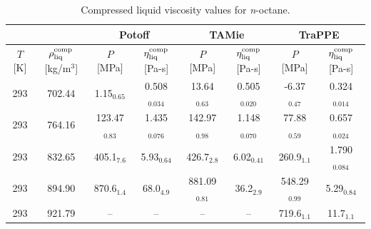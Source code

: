 \documentclass[preprint,review,12pt]{elsarticle}
\begin{document}
	\begin{table}[H]
		\caption{Compressed liquid viscosity values for \textit{n}-octane.}
		\begin{center}
			\begin{tabular}{|c|c|c|c|c|c|c|c|}
				\hline
				&                  & \multicolumn{2}{c|}{Potoff}     & \multicolumn{2}{c|}{TAMie}      & \multicolumn{2}{c|}{TraPPE}    \\ \hline
				$T$ {[}K{]} & $\rho^{\rm comp}_{\rm liq}$ {[}kg/m$^3${]} & $P$ {[}MPa{]}    & $\eta^{\rm comp}_{\rm liq}$ {[}Pa-s{]} & $P$ {[}MPa{]}    & $\eta^{\rm comp}_{\rm liq}$ {[}Pa-s{]} & $P$ {[}MPa{]}   & $\eta^{\rm comp}_{\rm liq}$ {[}Pa-s{]} \\ \hline
				293 & 702.44 & 1.15$_{0.65}$   & 0.508$_{0.034}$ & 13.64$_{0.63}$  & 0.505$_{0.020}$ & -6.37$_{0.47}$  & 0.324$_{0.014}$ \\ \hline
				293 & 764.16 & 123.47$_{0.83}$ & 1.435$_{0.076}$ & 142.97$_{0.98}$ & 1.148$_{0.070}$ & 77.88$_{0.59}$  & 0.657$_{0.024}$ \\ \hline
				293 & 832.65 & 405.1$_{7.6}$   & 5.93$_{0.64}$   & 426.7$_{2.8}$   & 6.02$_{0.41}$   & 260.9$_{1.1}$   & 1.790$_{0.084}$ \\ \hline
				293 & 894.90 & 870.6$_{1.4}$   & 68.0$_{4.9}$    & 881.09$_{0.81}$ & 36.2$_{2.9}$    & 548.29$_{0.99}$ & 5.29$_{0.84}$   \\ \hline
				293 & 921.79 & --               & --               & --               & --               & 719.6$_{1.1}$   & 11.7$_{1.1}$    \\ \hline
			\end{tabular}
		\end{center}
	\end{table}
\end{document}
